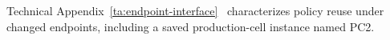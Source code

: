 \label{sec:endpoint-interface}
Technical Appendix~\ref{ta:endpoint-interface}~\cite{FGDUCSAnonymousArtifact} characterizes policy reuse under changed endpoints, including a saved production-cell instance named PC2.
